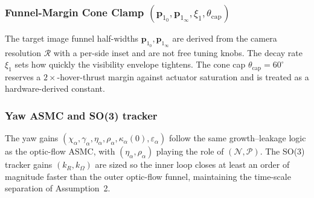 {\subsubsection{Funnel-Margin Cone Clamp $(\boldsymbol{p}_{1_0}, \boldsymbol{p}_{1_\infty}, \xi_1, \theta_\text{cap})$} The target image funnel half-widths $\boldsymbol{p}_{1_0}, \boldsymbol{p}_{1_\infty}$ are derived from the camera resolution $\mathcal{R}$ with a per-side inset and are not free tuning knobs. The decay rate $\xi_1$ sets how quickly the visibility envelope tightens. The cone cap $\theta_\text{cap}=60^\circ$ reserves a $2\times$-hover-thrust margin against actuator saturation and is treated as a hardware-derived constant.

\subsubsection{Yaw ASMC and SO(3) tracker} The yaw gains $(\chi_\alpha, \gamma_\alpha, \eta_\alpha, \rho_\alpha, \kappa_\alpha(0), \varepsilon_\alpha)$ follow the same growth--leakage logic as the optic-flow ASMC, with $(\eta_\alpha, \rho_\alpha)$ playing the role of $(\mathcal{N}, \mathcal{P})$. The SO(3) tracker gains $(k_R, k_\Omega)$ are sized so the inner loop closes at least an order of magnitude faster than the outer optic-flow funnel, maintaining the time-scale separation of Assumption~2.}

